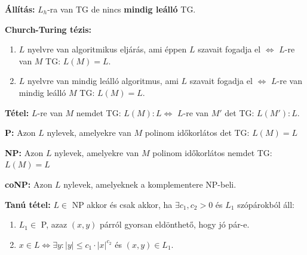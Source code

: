 \documentclass[a4paper]{article}
\begin{document}
\begin{tcolorbox}[size = fbox]
  \textbf{Állítás:} $L_h$-ra van TG de nincs \textbf{mindig leálló} TG.
\end{tcolorbox}

\begin{tcolorbox}[size = fbox]
  \textbf{Church-Turing tézis:} 
  \begin{enumerate}[label=(\roman*)]
    \item $L$ nyelvre van algoritmikus eljárás, ami éppen $L$ szavait fogadja el $\Longleftrightarrow$ $L$-re van $M$ TG: $L(M) = L$.
    \item $L$ nyelvre van mindig leálló algoritmus, ami $L$ szavait fogadja el $\Longleftrightarrow$ $L$-re van mindig leálló $M$ TG: $L(M) = L$.
  \end{enumerate}
\end{tcolorbox}

\begin{tcolorbox}[size = fbox]
  \textbf{Tétel:} $L$-re van $M$ nemdet TG: $L(M): L \Longleftrightarrow$ $L$-re van $M'$ det TG: $L(M'): L$.
\end{tcolorbox}

\begin{tcolorbox}[size = fbox]
  \textbf{P:} Azon $L$ nylevek, amelyekre van $M$ polinom időkorlátos det TG: $L(M) = L$
\end{tcolorbox}

\begin{tcolorbox}[size = fbox]
  \textbf{NP:} Azon $L$ nylevek, amelyekre van $M$ polinom időkorlátos nemdet TG: $L(M) = L$
\end{tcolorbox}

\begin{tcolorbox}[size = fbox]
  \textbf{coNP:} Azon $L$ nylevek, amelyeknek a komplementere NP-beli.
\end{tcolorbox}

\begin{tcolorbox}[size = fbox]
  \textbf{Tanú tétel:} $L \in $ NP akkor és csak akkor, ha $\exists c_1, c_2 > 0$ és $L_1$ szópárokból áll:
  \begin{enumerate}[label=(\roman*)]
    \item $L_1 \in $ P, azaz $(x, y)$ párról gyorsan eldönthető, hogy jó pár-e.
    \item $x \in L \Longleftrightarrow \exists y: |y| \leq c_1 \cdot |x|^{c_2}$ és $(x, y) \in L_1$. 
  \end{enumerate}
\end{tcolorbox}
\end{document}
